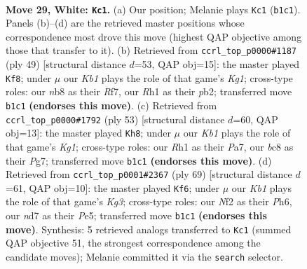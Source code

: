 \documentclass[11pt]{article}
\begin{document}
\clearpage

\begin{figure}[p]\centering
\begin{subfigure}{0.46\textwidth}\centering
\resizebox{\linewidth}{!}{%
\newchessgame
\chessboard[
  setfen={rnb5/3n2k1/8/1B1p4/p7/P5P1/1PP2N2/1K5R w - - 1 29},
  showmover=false,
  pgfstyle=straightmove, color=movearrow, markmove={b1-c1}
]}
\caption{}
\end{subfigure}\hfill
\begin{subfigure}{0.46\textwidth}\centering
\resizebox{\linewidth}{!}{%
\newchessgame
\chessboard[
  setfen={bn4k1/5rp1/1p5p/1P1Np3/7P/6P1/1P4B1/4K2R b K - 0 25},
  showmover=false,
  pgfstyle=straightmove, color=movearrow, markmove={g8-f8}
]}
\caption{}
\end{subfigure}
\\[4pt]
\begin{subfigure}{0.46\textwidth}\centering
\resizebox{\linewidth}{!}{%
\newchessgame
\chessboard[
  setfen={5rk1/pb4pp/2NR1n2/8/8/5BP1/3K3P/8 b - - 0 27},
  showmover=false,
  pgfstyle=straightmove, color=movearrow, markmove={g8-h8}
]}
\caption{}
\end{subfigure}\hfill
\begin{subfigure}{0.46\textwidth}\centering
\resizebox{\linewidth}{!}{%
\newchessgame
\chessboard[
  setfen={3r4/2b3p1/2p3kp/4p3/2N1P3/2P5/P1K1B3/2N5 b - - 9 35},
  showmover=false,
  pgfstyle=straightmove, color=movearrow, markmove={g6-f6}
]}
\caption{}
\end{subfigure}
\caption{\textbf{Move 29, White: \texttt{Kc1}.} (a) Our position; Melanie plays \texttt{Kc1} (\texttt{b1c1}). Panels (b)--(d) are the retrieved master positions whose correspondence most drove this move (highest QAP objective among those that transfer to it). (b) Retrieved from \texttt{ccrl\_top\_p0000\#1187} (ply 49) [structural distance $d$=53, QAP obj=15]: the master played \texttt{Kf8}; under $\mu$ our \emph{Kb1} plays the role of that game's \emph{Kg1}; cross-type roles: our \emph{n}b8 as their \emph{R}f7, our \emph{R}h1 as their \emph{p}b2; transferred move \texttt{b1c1} \textbf{(endorses this move)}. (c) Retrieved from \texttt{ccrl\_top\_p0000\#1792} (ply 53) [structural distance $d$=60, QAP obj=13]: the master played \texttt{Kh8}; under $\mu$ our \emph{Kb1} plays the role of that game's \emph{Kg1}; cross-type roles: our \emph{R}h1 as their \emph{P}a7, our \emph{b}c8 as their \emph{P}g7; transferred move \texttt{b1c1} \textbf{(endorses this move)}. (d) Retrieved from \texttt{ccrl\_top\_p0001\#2367} (ply 69) [structural distance $d$=61, QAP obj=10]: the master played \texttt{Kf6}; under $\mu$ our \emph{Kb1} plays the role of that game's \emph{Kg3}; cross-type roles: our \emph{N}f2 as their \emph{P}h6, our \emph{n}d7 as their \emph{P}e5; transferred move \texttt{b1c1} \textbf{(endorses this move)}. Synthesis: 5 retrieved analogs transferred to \texttt{Kc1} (summed QAP objective 51, the strongest correspondence among the candidate moves); Melanie committed it via the \texttt{search} selector.}
\label{fig:thought-m56}
\end{figure}
\end{document}
